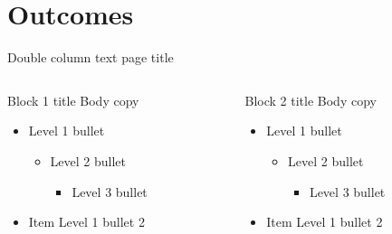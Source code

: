 \documentclass[t]{beamer}
\begin{document}
\section{Outcomes}

\begin{frame}{Double column text page title}
	\begin{columns}[T,totalwidth=\textwidth]
  		\begin{column}{0.45\textwidth}
  			\begin{block}{Block 1 title}
    				Body copy
    				\begin{itemize}    
    					\item Level 1 bullet
  					\begin{itemize}
  						\item Level 2 bullet
  						\begin{itemize}
  							\item Level 3 bullet
  						\end{itemize}
  					\end{itemize}
    					\item Item Level 1 bullet 2
    				\end{itemize}  
			\end{block}
  		\end{column} %
  		\begin{column}{0.45\textwidth}
  			\begin{block}{Block 2 title}
    				Body copy
    				\begin{itemize}    
    					\item Level 1 bullet
  					\begin{itemize}
  						\item Level 2 bullet
  						\begin{itemize}
  							\item Level 3 bullet
  						\end{itemize}
  					\end{itemize}
    					\item Item Level 1 bullet 2
    				\end{itemize}  
			\end{block}
  		\end{column}%
	\end{columns}
\end{frame}
\end{document}
